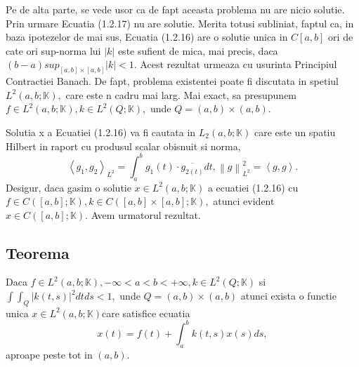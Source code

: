 \documentclass[a4paper,12pt,oneside]{report}
\begin{document}
Pe de alta parte, se vede usor ca de fapt aceasta problema nu are nicio solutie. Prin urmare Ecuatia (1.2.17) nu are solutie. Merita totusi subliniat, faptul ca, in baza ipotezelor de mai sus, Ecuatia (1.2.16) are o solutie unica in \(C\left [ a,b \right ]\) ori de cate ori sup-norma lui \(\left | k \right |\) este sufient de mica, mai precis, daca \(\left ( b-a \right )sup_{\left [ a,b \right ]\times \left [ a,b \right ]}\left | k \right | < 1.\) Acest rezultat urmeaza cu usurinta Principiul Contractiei Banach. De fapt, problema existentei poate fi discutata in spetiul \(L^{2} \left ( a,b ;\mathbb{K} \right ),\) care este n cadru mai larg. Mai exact, sa presupunem \(f\in L^{2}\left ( a,b;\mathbb{K} \right ), k\in L^{2}\left ( Q; \mathbb{K} \right ),\) unde \(Q = \left ( a,b \right )\times \left ( a,b \right ).\) 

Solutia x a Ecuatiei (1.2.16) va fi cautata in \(L_{2}\left ( a,b;\mathbb{K} \right )\) care este un spatiu Hilbert in raport cu produsul scalar obisnuit si norma, 
\begin{displaymath}
  \left \langle g_{1}, g_{2} \right \rangle_{L^{2}} = \int_{a}^{b}g_{1}\left ( t \right ) \cdot \overline{{g_{2\left ( t \right )}}}dt, \left \| g \right \|_{L^{2}}^{2} = \left \langle g,g \right \rangle.
\end{displaymath}
	Desigur, daca gasim o solutie \(x\in L^{2}\left ( a,b;\mathbb{K} \right )\) a ecuatiei (1.2.16) cu \(f\in C\left ( \left [ a,b \right ];\mathbb{K} \right ), k\in C\left ( \left [ a,b \right ]\times \left [ a,b \right ];\mathbb{K} \right ),\) atunci evident \(x\in C\left ( \left [ a,b \right ];\mathbb{K} \right ).\) Avem urmatorul rezultat. 

\subsection{Teorema }

Daca \(f\in L^{2}\left ( a,b;\mathbb{K} \right ), -\infty < a< b< +\infty , k\in L^{2}\left ( Q; \mathbb{K} \right )\) si \(\int \int _{Q}\left | k\left ( t,s \right ) \right |^{2}dtds< 1,\) unde \(Q = \left ( a,b \right )\times \left ( a,b \right )\) atunci exista o functie unica \(x\in L^{2} \left ( a,b;\mathbb{K} \right ) \)care satisfice ecuatia
 \begin{displaymath}
   x\left ( t \right ) = f\left ( t \right ) + \int_{a}^{b}k\left ( t,s \right )x\left ( s \right )ds, 
 \end{displaymath}
aproape peste tot in \(\left ( a,b  \right )\). 


%
%
%
%






\setlength{\baselineskip}{\normalbaselineskip}
\setlength{\parskip}{0pt}

\end{document}
